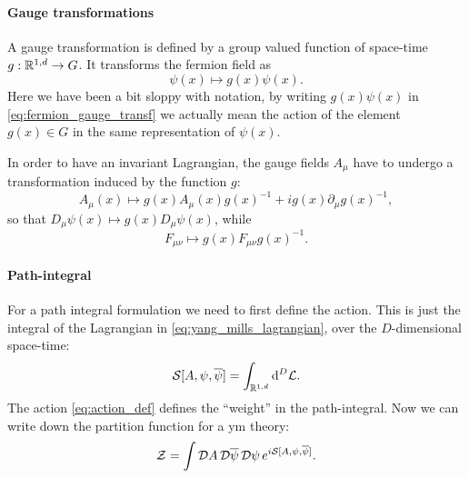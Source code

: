 \paragraph*{Gauge transformations}

A gauge transformation is defined by a group valued function of space-time $g: \mathbb{R}^{1,d} \to G$.
It transforms the fermion field as
\begin{equation}
    \psi(x) \mapsto g(x) \psi(x).
    \label{eq:fermion_gauge_transf}
\end{equation}
Here we have been a bit sloppy with notation, by writing $g(x) \psi(x)$ in \eqref{eq:fermion_gauge_transf} we actually mean the action of the element $g(x) \in G$ in the same representation of $\psi(x)$.

In order to have an invariant Lagrangian, the gauge fields $A_{\mu}$ have to undergo a transformation induced by the function $g$:
\begin{equation}
    A_{\mu}(x) \mapsto g(x) A_{\mu}(x) g(x)^{-1} + i g(x) \partial_{\mu} g(x)^{-1},
\end{equation}
so that $D_{\mu} \psi(x) \mapsto g(x) D_{\mu} \psi(x)$, while
\begin{equation}
    F_{\mu \nu} \mapsto g(x) F_{\mu \nu} g(x)^{-1}.
\end{equation}


\paragraph*{Path-integral}

For a path integral formulation we need to first define the action.
This is just the integral of the Lagrangian in \eqref{eq:yang_mills_lagrangian}, over the $D$-dimensional space-time:
\begin{equation}
    \mathcal{S}[A, \psi, \overline{\psi}] = \int_{\mathbb{R}^{1,d}}  \dd^{D} \mathcal{L}.
    \label{eq:action_def}
\end{equation}
The action \eqref{eq:action_def} defines the ``weight'' in the path-integral.
Now we can write down the partition function for a \ac{ym} theory:
\begin{equation}
    \mathcal{Z} = \int \mathcal{D} A\, \mathcal{D} \overline{\psi}\, \mathcal{D} \psi \, e^{i \mathcal{S}[A, \psi, \overline{\psi}]}.
    \label{eq:partition_function_mink}
\end{equation}


